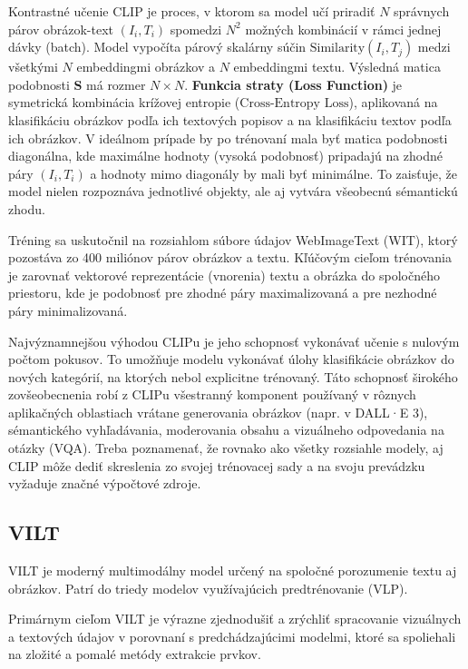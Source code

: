 \documentclass[]{tukediphc}
\begin{document}
Kontrastné učenie CLIP je proces, v ktorom sa model učí priradiť $N$ správnych párov obrázok-text $(I_i, T_i)$ spomedzi $N^2$ možných kombinácií v rámci jednej dávky (batch). Model vypočíta párový skalárny súčin $\text{Similarity}(I_i, T_j)$ medzi všetkými $N$ embeddingmi obrázkov a $N$ embeddingmi textu. Výsledná matica podobnosti $\mathbf{S}$ má rozmer $N \times N$. \textbf{Funkcia straty (Loss Function)} je symetrická kombinácia krížovej entropie ($\text{Cross-Entropy Loss}$), aplikovaná na klasifikáciu obrázkov podľa ich textových popisov a na klasifikáciu textov podľa ich obrázkov. V ideálnom prípade by po trénovaní mala byť matica podobnosti diagonálna, kde maximálne hodnoty (vysoká podobnosť) pripadajú na zhodné páry $(I_i, T_i)$ a hodnoty mimo diagonály by mali byť minimálne. To zaisťuje, že model nielen rozpoznáva jednotlivé objekty, ale aj vytvára všeobecnú sémantickú zhodu.\cite{researchgate:Learning_Transferable_Visual_Models_From_Natural_Language_Supervision}

Tréning sa uskutočnil na rozsiahlom súbore údajov WebImageText (WIT), ktorý pozostáva zo 400 miliónov párov obrázkov a textu. Kľúčovým cieľom trénovania je zarovnať vektorové reprezentácie (vnorenia) textu a obrázka do spoločného priestoru, kde je podobnosť pre zhodné páry maximalizovaná a pre nezhodné páry minimalizovaná.

Najvýznamnejšou výhodou CLIPu je jeho schopnosť vykonávať učenie s nulovým počtom pokusov. To umožňuje modelu vykonávať úlohy klasifikácie obrázkov do nových kategórií, na ktorých nebol explicitne trénovaný. Táto schopnosť širokého zovšeobecnenia robí z CLIPu všestranný komponent používaný v rôznych aplikačných oblastiach vrátane generovania obrázkov (napr. v DALL·E 3), sémantického vyhľadávania, moderovania obsahu a vizuálneho odpovedania na otázky (VQA). Treba poznamenať, že rovnako ako všetky rozsiahle modely, aj CLIP môže dediť skreslenia zo svojej trénovacej sady a na svoju prevádzku vyžaduje značné výpočtové zdroje.\cite{geeksforgeeks:clip}

\subsection{VILT}
VILT je moderný multimodálny model určený na spoločné porozumenie textu aj obrázkov. Patrí do triedy modelov využívajúcich predtrénovanie (VLP). 

Primárnym cieľom VILT je výrazne zjednodušiť a zrýchliť spracovanie vizuálnych a textových údajov v porovnaní s predchádzajúcimi modelmi, ktoré sa spoliehali na zložité a pomalé metódy extrakcie prvkov.
\end{document}
